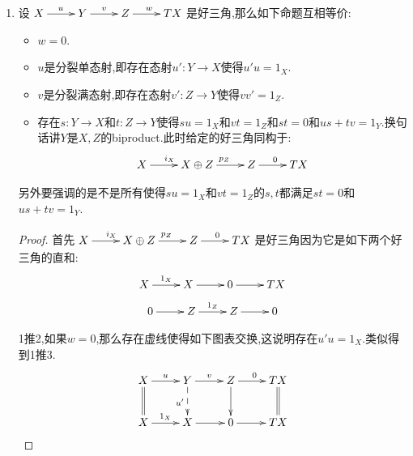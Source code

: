 \begin{enumerate}
\begin{proof}
    	于是实线的交换图表得到三角态射:
    	$$\xymatrix{X\ar[r]^u\ar[d]_{i_X}&Y\ar[r]^v\ar[d]_{i_Y}&Z\ar[r]^w\ar@{-->}[d]_i&TX\ar[d]_{i_{TX}}\\X\oplus X'\ar[r]^{u\oplus u'}&Y\oplus Y'\ar[r]^g&W\ar[r]^h&TX\oplus TX'}$$
    	
    	类似的有如下交换图表:
    	$$\xymatrix{X'\ar[r]^{u'}\ar[d]_{i_{X'}}&Y'\ar[r]^{v'}\ar[d]_{i_{Y'}}&Z'\ar[r]^{w'}\ar@{-->}[d]_j&TX'\ar[d]_{i_{TX'}}\\X\oplus X'\ar[r]^{u\oplus u'}&Y\oplus Y'\ar[r]^g&W\ar[r]^h&TX\oplus TX'}$$
    	
    	按照加性范畴上二元直和与直积同构,它们的泛性质得到如下交换图表:
    	$$\xymatrix{X\oplus X'\ar[r]^{u\oplus u'}\ar@{=}[d]&Y\oplus Y'\ar[r]^{v\oplus v'}\ar@{=}[d]&Z\oplus Z'\ar[r]^{w\oplus w'}\ar[d]_{i+j}&TX\oplus TX'\ar@{=}[d]\\X\oplus X'\ar[r]^{u\oplus u'}&Y\oplus Y'\ar[r]^g&W\ar[r]^h&TX\oplus TX'}$$
    	
    	现在分别将上同调函子$\mathrm{Hom}_{\mathscr{C}(W,-)}$和$\mathrm{Hom}_{\mathscr{C}}(-,Z\oplus Z')$作用在这个图表上.尽管上一行我们暂且不知道是好三角,但是由于它是好三角的直和,作用上同调函子同样得到长正合列,那么按照五引理可得$i+j$是同构,于是这是三角同构,于是按照$\mathrm{TR}1$得到第一行也是好三角.
    \end{proof}
    \item 设$\xymatrix{X\ar[r]^u&Y\ar[r]^v&Z\ar[r]^w&TX}$是好三角,那么如下命题互相等价:
    \begin{itemize}
    	\item $w=0$.
    	\item $u$是分裂单态射,即存在态射$u':Y\to X$使得$u'u=1_X$.
    	\item $v$是分裂满态射,即存在态射$v':Z\to Y$使得$vv'=1_Z$.
    	\item 存在$s:Y\to X$和$t:Z\to Y$使得$su=1_X$和$vt=1_Z$和$st=0$和$us+tv=1_Y$.换句话讲$Y$是$X,Z$的biproduct.此时给定的好三角同构于:$$\xymatrix{X\ar[r]^{i_X}&X\oplus Z\ar[r]^{p_Z}&Z\ar[r]^0&TX}$$
    \end{itemize}

    另外要强调的是不是所有使得$su=1_X$和$vt=1_Z$的$s,t$都满足$st=0$和$us+tv=1_Y$.
    \begin{proof}
    	
    	首先$\xymatrix{X\ar[r]^{i_X}&X\oplus Z\ar[r]^{p_Z}&Z\ar[r]^0&TX}$是好三角因为它是如下两个好三角的直和:$$\xymatrix{X\ar[r]^{1_X}&X\ar[r]&0\ar[r]&TX}$$
    	$$\xymatrix{0\ar[r]&Z\ar[r]^{1_Z}&Z\ar[r]&0}$$
    	
    	1推2,如果$w=0$,那么存在虚线使得如下图表交换,这说明存在$u'u=1_X$.类似得到1推3.
    	$$\xymatrix{X\ar@{=}[d]\ar[r]^u&Y\ar[r]^v\ar@{-->}[d]_{u'}&Z\ar[r]^0\ar[d]&TX\ar@{=}[d]\\X\ar[r]^{1_X}&X\ar[r]&0\ar[r]&TX}$$
    	

\end{proof}
\end{enumerate}
